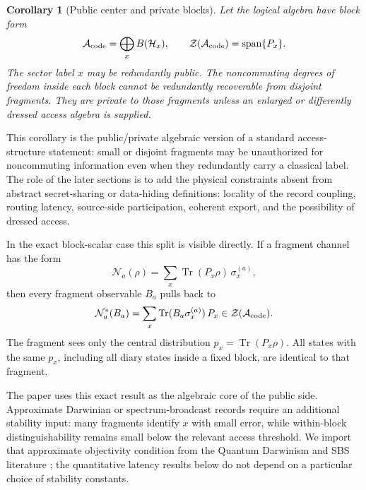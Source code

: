 \documentclass[11pt]{article}
\newtheorem{corollary}{Corollary}
\newcommand{\cN}{\mathcal N}
\newcommand{\cH}{\mathcal H}
\newcommand{\cA}{\mathcal A}
\newcommand{\cZ}{\mathcal Z}
\newcommand{\Tr}{\operatorname{Tr}}
\begin{document}
\begin{corollary}[Public center and private blocks]
\label{cor:public-private}
Let the logical algebra have block form
\begin{equation}
  \cA_{\rm code}
  =
  \bigoplus_x B(\cH_x),
  \qquad
  \cZ(\cA_{\rm code})
  =
  \operatorname{span}\{P_x\}.
\end{equation}
The sector label $x$ may be redundantly public.  The noncommuting
degrees of freedom inside each block cannot be redundantly recoverable
from disjoint fragments.  They are private to those fragments unless an
enlarged or differently dressed access algebra is supplied.
\end{corollary}

This corollary is the public/private algebraic version of a standard
access-structure statement: small or disjoint fragments may be
unauthorized for noncommuting information even when they redundantly
carry a classical label.  The role of the later sections is to add the
physical constraints absent from abstract secret-sharing or data-hiding
definitions: locality of the record coupling, routing latency,
source-side participation, coherent export, and the possibility of
dressed access.

In the exact block-scalar case this split is visible directly.  If a
fragment channel has the form
\begin{equation}
  \cN_a(\rho)
  =
  \sum_x \Tr(P_x\rho)\,\sigma_x^{(a)},
\end{equation}
then every fragment observable $B_a$ pulls back to
\begin{equation}
  \cN_a^*(B_a)
  =
  \sum_x \Tr(B_a\sigma_x^{(a)})\,P_x
  \in \cZ(\cA_{\rm code}).
\end{equation}
The fragment sees only the central distribution $p_x=\Tr(P_x\rho)$.
All states with the same $p_x$, including all diary states inside a
fixed block, are identical to that fragment.

The paper uses this exact result as the algebraic core of the public
side.  Approximate Darwinian or spectrum-broadcast records require an
additional stability input: many fragments identify $x$ with small
error, while within-block distinguishability remains small below the
relevant access threshold.  We import that approximate objectivity
condition from the Quantum Darwinism and SBS literature
\citep{Brandao2015GenericClassical,Le2019StrongQD,Korbicz2020Roads};
the quantitative latency results below do not depend on a particular
choice of stability constants.
\end{document}
